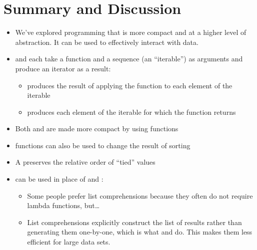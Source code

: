 \documentclass[letterpaper,10pt,english]{sphinxmanual}
\begin{document}
\section{Summary and Discussion}
\label{\detokenize{lecture_notes/lec24_functional:summary-and-discussion}}\begin{itemize}
\item {} 
We’ve explored programming that is more compact and at a higher
level of abstraction.  It can be used to effectively interact with
data.

\item {} 
 and  each take a function and a sequence (an
“iterable”) as arguments and produce an iterator as a result:
\begin{itemize}
\item {} 
 produces the result of applying the function to each element
of the iterable

\item {} 
 produces each element of the iterable for which the
function returns 

\end{itemize}

\item {} 
Both  and  are made more compact by using
 functions

\item {} 
 functions can also be used to change the result of
sorting

\item {} 
A  preserves the relative order of “tied” values

\item {} 
 can be used in place of  and
:
\begin{itemize}
\item {} 
Some people prefer list comprehensions  because they often do not
require lambda functions, but…

\item {} 
List comprehensions explicitly construct the list of results rather than
generating them one-by-one, which is what  and 
do.  This makes them less efficient for large data sets.


\end{itemize}
\end{itemize}
\end{document}
